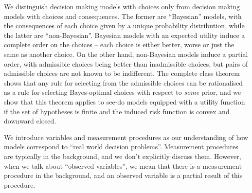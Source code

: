 We distinguish decision making models with choices only from decision making models with choices and consequences. The former are ``Bayesian'' models, with the consequences of each choice given by a unique probability distribution, while the latter are ``non-Bayesian''. Bayesian models with an expected utility induce a complete order on the choices -- each choice is either better, worse or just the same as another choice. On the other hand, non-Bayesian models induce a partial order, with admissible choices being better than inadmissible choices, but pairs of admissible choices are not known to be indifferent. The complete class theorem shows that any rule for selecting from the admissible choices can be rationalised as a rule for selecting Bayes-optimal choices with respect to \emph{some} prior, and we show that this theorem applies to see-do models equipped with a utility function if the set of hypotheses is finite and the induced risk function is convex and downward closed.

We introduce variables and measurement procedures as our understanding of how models correspond to ``real world decision problems''. Measurement procedures are typically in the background, and we don't explicitly discuss them. However, when we talk about ``observed variables'', we mean that there is a measurement procedure in the background, and an observed variable is a partial result of this procedure.